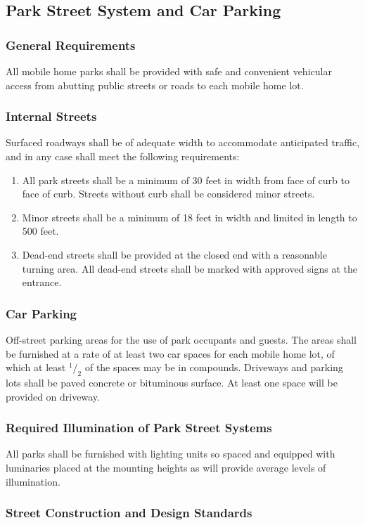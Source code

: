 \subsection{Park Street System and Car Parking}
\subsubsection{General Requirements}
All mobile home parks shall be provided with safe and convenient vehicular access from abutting public streets or roads to each mobile home lot.
\subsubsection{Internal Streets}
Surfaced roadways shall be of adequate width to accommodate anticipated traffic, and in any case shall meet the following requirements:
\begin{enumerate}[{\indent}a)]
    \item All park streets shall be a minimum of 30 feet in width from face of curb to face of curb.  Streets without curb shall be considered minor streets.
    \item Minor streets shall be a minimum of 18 feet in width and limited in length to 500 feet.
    \item Dead-end streets shall be provided at the closed end with a reasonable turning area.  All dead-end streets shall be marked with approved signs at the entrance.
\end{enumerate}
\subsubsection{Car Parking}
Off-street parking areas for the use of park occupants and guests. The areas shall be furnished at a rate of at least two car spaces for each mobile home lot, of which at least ${^1/_2}$ of the spaces may be in compounds. Driveways and parking lots shall be paved concrete or bituminous surface. At least one space will be provided on driveway.
\subsubsection{Required Illumination of Park Street Systems}
All parks shall be furnished with lighting units so spaced and equipped with luminaries placed at the mounting heights as will provide average levels of illumination.
\subsubsection{Street Construction and Design Standards}
